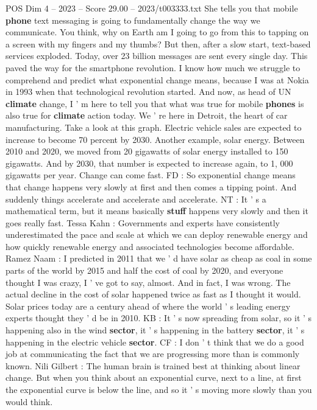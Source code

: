 \begin{textsample}{POS Dim 4 – 2023 – Score 29.00 – 2023/t003333.txt}
She tells you that mobile \textbf{phone} text messaging is going to fundamentally change the way we communicate.
You think, why on Earth am I going to go from this to tapping on a screen with my fingers and my thumbs?
But then, after a slow start, text-based services exploded.
Today, over 23 billion messages are sent every single day.
This paved the way for the smartphone revolution.
I know how much we struggle to comprehend and predict what exponential change means, because I was at Nokia in 1993 when that technological revolution started.
And now, as head of UN \textbf{climate} change, I ' m here to tell you that what was true for mobile \textbf{phones} is also true for \textbf{climate} action today.
We ' re here in Detroit, the heart of car manufacturing.
Take a look at this graph.
Electric vehicle sales are expected to increase to become 70 percent by 2030.
Another example, solar energy.
Between 2010 and 2020, we moved from 20 gigawatts of solar energy installed to 150 gigawatts.
And by 2030, that number is expected to increase again, to 1, 000 gigawatts per year.
Change can come fast.
FD : So exponential change means that change happens very slowly at first and then comes a tipping point.
And suddenly things accelerate and accelerate and accelerate.
NT : It ' s a mathematical term, but it means basically \textbf{stuff} happens very slowly and then it goes really fast.
Tessa Kahn : Governments and experts have consistently underestimated the pace and scale at which we can deploy renewable energy and how quickly renewable energy and associated technologies become affordable.
Ramez Naam : I predicted in 2011 that we ' d have solar as cheap as coal in some parts of the world by 2015 and half the cost of coal by 2020, and everyone thought I was crazy, I ' ve got to say, almost.
And in fact, I was wrong.
The actual decline in the cost of solar happened twice as fast as I thought it would.
Solar prices today are a century ahead of where the world ' s leading energy experts thought they ' d be in 2010.
KB : It ' s now spreading from solar, so it ' s happening also in the wind \textbf{sector}, it ' s happening in the battery \textbf{sector}, it ' s happening in the electric vehicle \textbf{sector}.
CF : I don ' t think that we do a good job at communicating the fact that we are progressing more than is commonly known.
Nili Gilbert : The human brain is trained best at thinking about linear change.
But when you think about an exponential curve, next to a line, at first the exponential curve is below the line, and so it ' s moving more slowly than you would think.

\end{textsample}
